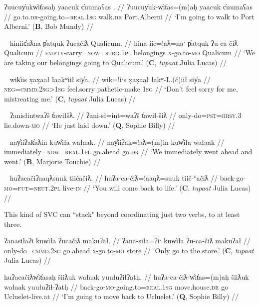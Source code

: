 \ex \label{ex:walktoalberni}
\begingl
\glpreamble ʔuucuy̓ukw̓it̓asaḥ yaacuk c̓uumaʕas . //
\gla ʔuucuy̓uk-w̓it̓as=(m)aḥ yaacuk c̓uumaʕas //
\glb go.to.\textsc{dr}-going.to=\textsc{real.1sg} walk.\textsc{dr} Port.Alberni //
\glft `I'm going to walk to Port Alberni.' (\textbf{B}, Bob Mundy) //
\endgl
\xe

\ex~ \label{ex:carryluggage}
\begingl
\glpreamble hiniic̓aƛna p̓atquk ʔucačiƛ Qualicum. //
\gla hina-iic=!aƛ=naˑ p̓atquk ʔu-ca-čiƛ Qualicum //
\glb \textsc{empty}-carry=\textsc{now}=\textsc{strg.1pl} belongings \textsc{x}-go.to-\textsc{mo} Qualicum //
\glft `We are taking our belongings going to Qualicum.' (\textbf{C}, \textit{tupaat} Julia Lucas) //
\endgl
\xe

\ex~ \label{ex:dontmistreatme}
\begingl
\glpreamble wik̓iis x̣ax̣aał łaakʷiił siy̓a. //
\gla wik=!iˑs x̣ax̣aał łakʷ-L.(č)iił siy̓a //
\glb \textsc{neg}=\textsc{cmmd.2sg>1sg} feel.sorry pathetic-make \textsc{1sg} //
\glft `Don't feel sorry for me, mistreating me.' (\textbf{C}, \textit{tupaat} Julia Lucas) //
\endgl
\xe

\ex~ \label{ex:justliedown}
\begingl
\glpreamble ʔanisłintwaʔš t̓awiłšƛ. //
\gla ʔani-sł=int=waʔš t̓awił-šiƛ //
\glb only-do=\textsc{pst}=\textsc{hrsy.3} lie.down-\textsc{mo} //
\glft `He just laid down.' (\textbf{Q}, Sophie Billy) //
\endgl
\xe

\ex~ \label{ex:goaheadwent}
\begingl
\glpreamble nay̓iiʔak̓aƛin kuw̓iła wałaak. //
\gla nay̓iiʔak=!aƛ=(m)in kuw̓iła wałaak //
\glb immediately=\textsc{now}=\textsc{real.1pl} go.ahead go.\textsc{dr} //
\glft `We immediately went ahead and went.' (\textbf{B}, Marjorie Touchie) //
\endgl
\xe

\ex~ \label{ex:comebacktolife}
\begingl
\glpreamble huʔacačiʔaaqƛsuuk tiičačiƛ. //
\gla huʔa-ca-čiƛ=!aaqƛ=suuk tiič-°ačiƛ //
\glb back-go-\textsc{mo}=\textsc{fut}=\textsc{neut.2pl} live-\textsc{in} //
\glft `You will come back to life.' (\textbf{C}, \textit{tupaat} Julia Lucas) //
\endgl
\xe

This kind of SVC can ``stack" beyond coordinating just two verbs, to at least three.

\ex \label{ex:onlygotostore}
\begingl
\glpreamble ʔanasiłaʔi kuw̓iła ʔucačiƛ makuʔał. //
\gla ʔana-siła=ʔiˑ kuw̓iła ʔu-ca-čiƛ makuʔał //
\glb only-do=\textsc{cmmd.2sg} go.ahead \textsc{x}-go.to-\textsc{mo} store //
\glft `Only go to the store.' (\textbf{C}, \textit{tupaat} Julia Lucas) //
\endgl
\xe

\ex \label{ex:movebackucluelet}
\begingl
\glpreamble huʔacačiƛw̓it̓asaḥ šiiƛuk wałaak yuułuʔiłʔatḥ. //
\gla huʔa-ca-čiƛ-w̓it̓as=(m)aḥ šiiƛuk wałaak yuułuʔił-ʔatḥ //
\glb back-go-\textsc{mo}-going.to=\textsc{real.1sg} move.house.\textsc{dr} go Ucluelet-live.at //
\glft `I'm going to move back to Ucluelet.' (\textbf{Q}, Sophie Billy) //
\endgl
\xe

